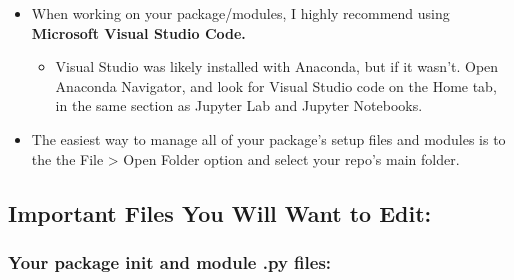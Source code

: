 \documentclass[11pt]{article}
\providecommand{\tightlist}{%
      \setlength{\itemsep}{0pt}\setlength{\parskip}{0pt}}
\begin{document}
\begin{itemize}
\tightlist
\item
  When working on your package/modules, I highly recommend using
  \textbf{Microsoft Visual Studio Code.}

  \begin{itemize}
  \tightlist
  \item
    Visual Studio was likely installed with Anaconda, but if it wasn't.
    Open Anaconda Navigator, and look for Visual Studio code on the Home
    tab, in the same section as Jupyter Lab and Jupyter Notebooks.
  \end{itemize}
\item
  The easiest way to manage all of your package's setup files and
  modules is to the the File \textgreater{} Open Folder option and
  select your repo's main folder.
\end{itemize}

\hypertarget{important-files-you-will-want-to-edit}{%
\subsection{Important Files You Will Want to
Edit:}\label{important-files-you-will-want-to-edit}}

\hypertarget{your-package-init-and-module-.py-files}{%
\subsubsection{\texorpdfstring{Your package \textbf{init} and module .py
files:}{Your package init and module .py files:}}\label{your-package-init-and-module-.py-files}}
\end{document}
